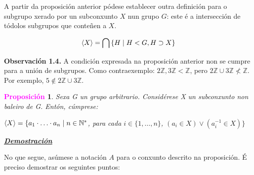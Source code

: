 \documentclass[twoside]{report}
\newcommand{\magbf}[1]{\textcolor{magenta}{\textbf{#1}}} %
\theoremstyle{mystyle}
\newtheorem{prop}{\magbf{Proposición}}[chapter]
\newenvironment{proposition}
{\begin{mdframed}[linecolor = magenta,backgroundcolor = classicrose, linewidth = 2mm]\begin{prop}}
{\end{prop}\end{mdframed}}
\begin{document}
\vspace{3mm}

\noindent A partir da proposición anterior pódese establecer outra definición para o subgrupo xerado por un subconxunto $X$ nun grupo $G$: este é a intersección de tódolos subgrupos que conteñen a $X$.


    $$\langle X \rangle = \bigcap{ \{H \hspace{1MM} | \hspace{1MM} H < G, H \supset X\} } $$


\vspace{3mm}

\noindent \textbf{Observación 1.4.} A condición expresada na proposición anterior non se cumpre para a unión de subgrupos. Como contraexemplo: $2\mathbb{Z}, 3\mathbb{Z} < \mathbb{Z}$, pero $2\mathbb{Z} \cup 3\mathbb{Z} \nless \mathbb{Z}$. Por exemplo, $5 \notin 2\mathbb{Z} \cup 3\mathbb{Z}$.

\vspace{3mm}

\begin{proposition} \label{prop1.2}
Sexa G un grupo arbitrario. Considérese X un subconxunto non baleiro de G. Entón, cúmprese:
\begin{center}
    $\langle X \rangle = \{a_{1} \cdot \ldots \cdot a_{n} \hspace{1mm} | \hspace{1mm} n \in \mathbb{N^{*}}$, para cada $i \in \{1, \dots, n\}$, $(a_{i} \in X) \lor (a_{i}^{-1} \in X) \}$
\end{center}
\end{proposition}

\vspace{2mm}

\noindent \textbf{\textit{\underline{Demostración}}}

\vspace{2mm}

\noindent No que segue, asúmese a notación $A$ para o conxunto descrito na proposición. É preciso demostrar os seguintes puntos:
\end{document}
